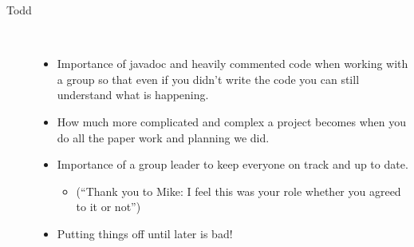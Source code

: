\begin{description}
		\item[Todd] ~\\
			\begin{itemize}
				\item Importance of javadoc and heavily commented code when working with a group so that even if you didn't write the code you can still understand what is happening.
				\item How much more complicated and complex a project becomes when you do all the paper work and planning we did.
				\item Importance of a group leader to keep everyone on track and up to date.
				\begin{itemize}
					\item (``Thank you to Mike: I feel this was your role whether you agreed to it or not'')
				\end{itemize}
				\item Putting things off until later is bad!
			\end{itemize}
			
	\end{description}